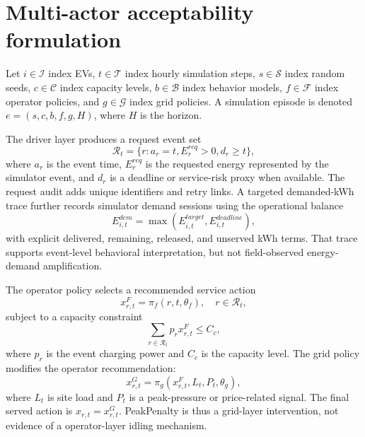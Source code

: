 \documentclass[12pt]{article}
\begin{document}
\section{Multi-actor acceptability formulation}\label{sec:formulation}

Let $i \in \mathcal{I}$ index EVs, $t \in \mathcal{T}$ index hourly simulation steps, $s \in \mathcal{S}$ index random seeds, $c \in \mathcal{C}$ index capacity levels, $b \in \mathcal{B}$ index behavior models, $f \in \mathcal{F}$ index operator policies, and $g \in \mathcal{G}$ index grid policies. A simulation episode is denoted $e=(s,c,b,f,g,H)$, where $H$ is the horizon.

The driver layer produces a request event set
\begin{equation}
\mathcal{R}_t = \{r: a_r=t, E_r^{req}>0, d_r \geq t\},
\label{eq:requestset}
\end{equation}
where $a_r$ is the event time, $E_r^{req}$ is the requested energy represented by the simulator event, and $d_r$ is a deadline or service-risk proxy when available. The request audit adds unique identifiers and retry links. A targeted demanded-kWh trace further records simulator demand sessions using the operational balance
\begin{equation}
E^{dem}_{i,t}=\max\left(E^{target}_{i,t},E^{deadline}_{i,t}\right),
\label{eq:demkwh}
\end{equation}
with explicit delivered, remaining, released, and unserved kWh terms. That trace supports event-level behavioral interpretation, but not field-observed energy-demand amplification.

The operator policy selects a recommended service action
\begin{equation}
x_{r,t}^F = \pi_f(r,t,\theta_f), \quad r \in \mathcal{R}_t,
\label{eq:fleetpolicy}
\end{equation}
subject to a capacity constraint
\begin{equation}
\sum_{r \in \mathcal{R}_t} p_r x_{r,t}^F \leq C_c,
\label{eq:capacity}
\end{equation}
where $p_r$ is the event charging power and $C_c$ is the capacity level. The grid policy modifies the operator recommendation:
\begin{equation}
x_{r,t}^G = \pi_g(x_{r,t}^F,L_t,P_t,\theta_g),
\label{eq:gridpolicy}
\end{equation}
where $L_t$ is site load and $P_t$ is a peak-pressure or price-related signal. The final served action is $x_{r,t}=x_{r,t}^G$. PeakPenalty is thus a grid-layer intervention, not evidence of a operator-layer idling mechanism.
\end{document}
